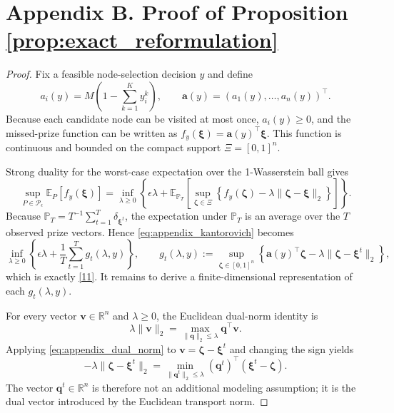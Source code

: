 \documentclass[preprint,12pt,authoryear]{elsarticle}
\theoremstyle{definition}
\begin{document}
\section*{Appendix B. Proof of Proposition \ref{prop:exact_reformulation}}
\begin{proof}
{
Fix a feasible node-selection decision $y$ and define
\begin{equation}
a_i(y)=M\left(1-\sum_{k=1}^{K}y_i^k\right),
\qquad
\boldsymbol{a}(y)=(a_1(y),\ldots,a_n(y))^\top.
\label{eq:appendix_a_definition}
\end{equation}
Because each candidate node can be visited at most once, $a_i(y)\geq0$, and the missed-prize function can be written as
$f_y(\boldsymbol{\xi})=\boldsymbol{a}(y)^\top\boldsymbol{\xi}$.
This function is continuous and bounded on the compact support $\Xi=[0,1]^n$.

Strong duality for the worst-case expectation over the 1-Wasserstein ball gives
\begin{equation}
\sup_{P\in\mathcal{P}_\epsilon}\mathbb{E}_{P}[f_y(\boldsymbol{\xi})]
=
\inf_{\lambda\geq0}
\left\{
\epsilon\lambda+
\mathbb{E}_{\mathbb{P}_T}
\left[
\sup_{\boldsymbol{\zeta}\in\Xi}
\left\{
f_y(\boldsymbol{\zeta})-\lambda\|\boldsymbol{\zeta}-\boldsymbol{\xi}\|_2
\right\}
\right]
\right\}.
\label{eq:appendix_kantorovich}
\end{equation}
Because $\mathbb{P}_T=T^{-1}\sum_{t=1}^{T}\delta_{\boldsymbol{\xi}^t}$, the expectation under $\mathbb{P}_T$ is an average over the $T$ observed prize vectors. Hence \eqref{eq:appendix_kantorovich} becomes
\begin{equation}
\inf_{\lambda\geq0}
\left\{
\epsilon\lambda+
\frac{1}{T}\sum_{t=1}^{T}
g_t(\lambda,y)
\right\},
\qquad
g_t(\lambda,y):=
\sup_{\boldsymbol{\zeta}\in[0,1]^n}
\left\{
\boldsymbol{a}(y)^\top\boldsymbol{\zeta}
-\lambda\|\boldsymbol{\zeta}-\boldsymbol{\xi}^t\|_2
\right\},
\label{eq:appendix_sample_decomposition}
\end{equation}
which is exactly \eqref{11}. It remains to derive a finite-dimensional representation of each $g_t(\lambda,y)$.

For every vector $\boldsymbol{v}\in\mathbb{R}^n$ and $\lambda\geq0$, the Euclidean dual-norm identity is
\begin{equation}
\lambda\|\boldsymbol{v}\|_2
=\max_{\|\boldsymbol{q}\|_2\leq\lambda}\boldsymbol{q}^\top\boldsymbol{v}.
\label{eq:appendix_dual_norm}
\end{equation}
Applying \eqref{eq:appendix_dual_norm} to
$\boldsymbol{v}=\boldsymbol{\zeta}-\boldsymbol{\xi}^t$ and changing the sign yields
\begin{equation}
-\lambda\|\boldsymbol{\zeta}-\boldsymbol{\xi}^t\|_2
=
\min_{\|\boldsymbol{q}^{t}\|_2\leq\lambda}
(\boldsymbol{q}^{t})^\top(\boldsymbol{\xi}^t-\boldsymbol{\zeta}).
\label{eq:appendix_negative_norm}
\end{equation}
The vector $\boldsymbol{q}^{t}\in\mathbb{R}^n$ is therefore not an additional modeling assumption; it is the dual vector introduced by the Euclidean transport norm.

}
\end{proof}
\end{document}
